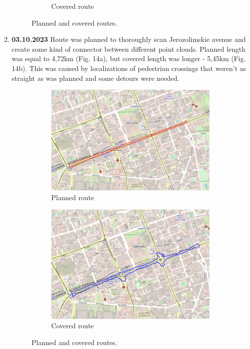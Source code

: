 \documentclass[a4paper,12pt]{article}
\begin{document}
\begin{enumerate}
\begin{figure}[H]
\begin{subfigure}{.77\textwidth}
			\caption{Covered route}
			\label{fig:b12}
		\end{subfigure}
		\caption{Planned and covered routes.}
		\label{fig:fig12}
	\end{figure} 
	\item \textbf{03.10.2023} Route was planned to thoroughly scan Jerozolimskie avenue and create some kind of connector between different point clouds. Planned length was equal to 4,72km (Fig. 14a), but covered length was longer - 5,45km (Fig. 14b). This was caused by localizations of pedestrian crossings that weren't as straight as was planned and some detours were needed.
	\begin{figure}[H]
		\centering
		\begin{subfigure}{.90\textwidth}
			\centering
			\includegraphics[width=1\linewidth]{route_p13}
			\caption{Planned route}
			\label{fig:a13}
		\end{subfigure}%
		\linebreak
		\begin{subfigure}{.90\textwidth}
			\centering
			\includegraphics[width=1\linewidth]{route_c13}
			\caption{Covered route}
			\label{fig:b13}
		\end{subfigure}
		\caption{Planned and covered routes.}
		\label{fig:fig13}
	\end{figure}
	\pagebreak
	

\end{enumerate}
\end{document}
